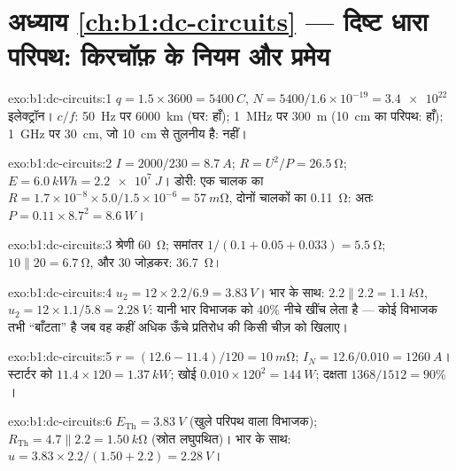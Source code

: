 \section*{अध्याय \ref{ch:b1:dc-circuits} --- दिष्ट धारा परिपथ: किरचॉफ़ के नियम और प्रमेय}

\begin{solution}{exo:b1:dc-circuits:1}
$q = 1.5 \times 3600 = \qty{5400}{C}$, $N = 5400/1.6\times10^{-19} =
\num{3.4e22}$ इलेक्ट्रॉन। $c/f$: \qty{50}{Hz} पर \qty{6000}{km} (घर:
हाँ); \qty{1}{MHz} पर \qty{300}{m} (\qty{10}{cm} का परिपथ: हाँ);
\qty{1}{GHz} पर \qty{30}{cm}, जो \qty{10}{cm} से तुलनीय है: नहीं।
\end{solution}

\begin{solution}{exo:b1:dc-circuits:2}
$I = 2000/230 = \qty{8.7}{A}$; $R = U^2/P = \qty{26.5}{\ohm}$; $E =
\qty{6.0}{kWh} = \qty{2.2e7}{J}$। डोरी: एक चालक का $R = 1.7\times10^{-8}
\times 5.0/1.5\times10^{-6} = \qty{57}{m\ohm}$, दोनों चालकों का
\qty{0.11}{\ohm}: अतः $P = 0.11 \times 8.7^2 = \qty{8.6}{W}$।
\end{solution}

\begin{solution}{exo:b1:dc-circuits:3}
श्रेणी \qty{60}{\ohm}; समांतर $1/(0.1 + 0.05 + 0.033) = \qty{5.5}{\ohm}$;
$10 \parallel 20 = \qty{6.7}{\ohm}$, और $30$ जोड़कर: \qty{36.7}{\ohm}।
\end{solution}

\begin{solution}{exo:b1:dc-circuits:4}
$u_2 = 12 \times 2.2/6.9 = \qty{3.83}{V}$। भार के साथ: $2.2 \parallel 2.2 =
\qty{1.1}{k\ohm}$, $u_2 = 12 \times 1.1/5.8 = \qty{2.28}{V}$: यानी भार
विभाजक को $40\%$ नीचे खींच लेता है --- कोई विभाजक तभी ``बाँटता'' है जब वह
कहीं अधिक ऊँचे प्रतिरोध की किसी चीज़ को खिलाए।
\end{solution}

\begin{solution}{exo:b1:dc-circuits:5}
$r = (12.6 - 11.4)/120 = \qty{10}{m\ohm}$; $I_N = 12.6/0.010 =
\qty{1260}{A}$। स्टार्टर को $11.4 \times 120 = \qty{1.37}{kW}$; खोई
$0.010 \times 120^2 = \qty{144}{W}$; दक्षता $1368/1512 = 90\%$।
\end{solution}

\begin{solution}{exo:b1:dc-circuits:6}
$E_{\mathrm{Th}} = \qty{3.83}{V}$ (खुले परिपथ वाला विभाजक); $R_{\mathrm{Th}}
= 4.7 \parallel 2.2 = \qty{1.50}{k\ohm}$ (स्रोत लघुपथित)। भार के साथ:
$u = 3.83 \times 2.2/(1.50 + 2.2) = \qty{2.28}{V}$।
\end{solution}

